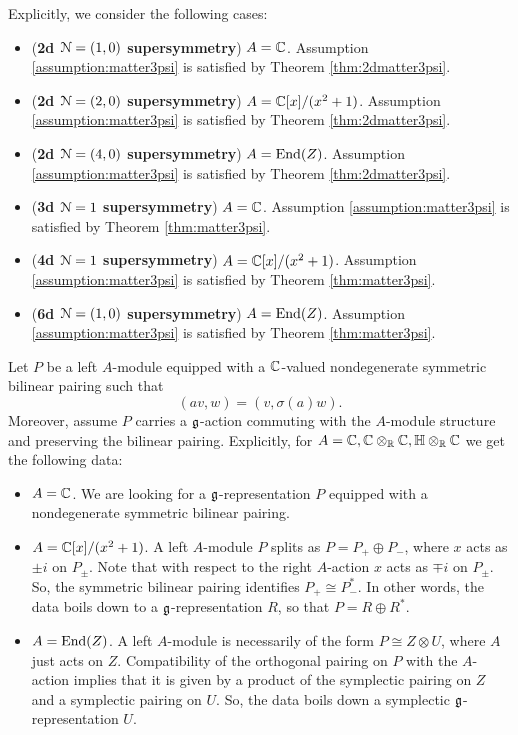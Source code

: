\documentclass[10pt, oneside]{article}
\begin{document}
Explicitly, we consider the following cases:
\begin{itemize}
\item (\textbf{2d $\mathcal N=(1, 0)$ supersymmetry}) $A = \mathbb C$. Assumption \ref{assumption:matter3psi} is satisfied by Theorem \ref{thm:2dmatter3psi}.

\item (\textbf{2d $\mathcal N=(2, 0)$ supersymmetry}) $A = \mathbb C[x]/(x^2+1)$. Assumption \ref{assumption:matter3psi} is satisfied by Theorem \ref{thm:2dmatter3psi}.

\item (\textbf{2d $\mathcal N=(4, 0)$ supersymmetry}) $A = \operatorname{End}(Z)$. Assumption \ref{assumption:matter3psi} is satisfied by Theorem \ref{thm:2dmatter3psi}.

\item (\textbf{3d $\mathcal N=1$ supersymmetry}) $A = \mathbb C$. Assumption \ref{assumption:matter3psi} is satisfied by Theorem \ref{thm:matter3psi}.

\item (\textbf{4d $\mathcal N=1$ supersymmetry}) $A = \mathbb C[x]/(x^2+1)$. Assumption \ref{assumption:matter3psi} is satisfied by Theorem \ref{thm:matter3psi}.

\item (\textbf{6d $\mathcal N=(1, 0)$ supersymmetry}) $A = \operatorname{End}(Z)$. Assumption \ref{assumption:matter3psi} is satisfied by Theorem \ref{thm:matter3psi}.
\end{itemize}

Let $P$ be a left $A$-module equipped with a $\mathbb C$-valued nondegenerate symmetric bilinear pairing such that
\[(av, w) = (v, \sigma(a)w).\]
Moreover, assume $P$ carries a $\mathfrak g$-action commuting with the $A$-module structure and preserving the bilinear pairing. Explicitly, for $A=\mathbb C, \mathbb C\otimes_\mathbb R\mathbb C, \mathbb{H}\otimes_\mathbb R\mathbb C$ we get the following data:
\begin{itemize}
\item $A=\mathbb C$. We are looking for a $\mathfrak g$-representation $P$ equipped with a nondegenerate symmetric bilinear pairing.

\item $A=\mathbb C[x]/(x^2+1)$. A left $A$-module $P$ splits as $P=P_+\oplus P_-$, where $x$ acts as $\pm i$ on $P_{\pm}$. Note that with respect to the right $A$-action $x$ acts as $\mp i$ on $P_{\pm}$. So, the symmetric bilinear pairing identifies $P_+\cong P_-^*$. In other words, the data boils down to a $\mathfrak g$-representation $R$, so that $P = R\oplus R^*$.

\item $A=\operatorname{End}(Z)$. A left $A$-module is necessarily of the form $P\cong Z\otimes U$, where $A$ just acts on $Z$. Compatibility of the orthogonal pairing on $P$ with the $A$-action implies that it is given by a product of the symplectic pairing on $Z$ and a symplectic pairing on $U$. So, the data boils down a symplectic $\mathfrak g$-representation $U$.
\end{itemize}
\end{document}
